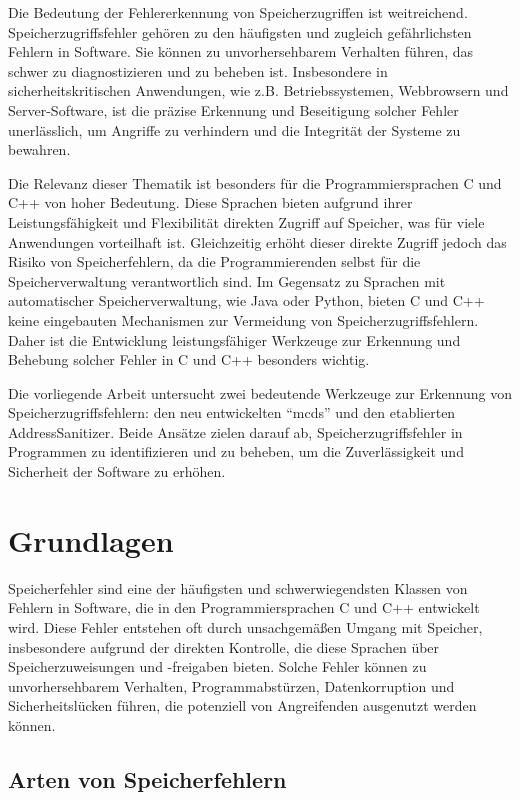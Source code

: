 \documentclass[acmtog,nonacm]{acmart}
\begin{document}
Die Bedeutung der Fehlererkennung von Speicherzugriffen ist weitreichend.
Speicherzugriffsfehler gehören zu den häufigsten und zugleich gefährlichsten
Fehlern in Software. Sie können zu unvorhersehbarem Verhalten führen, das
schwer zu diagnostizieren und zu beheben ist. Insbesondere in
sicherheitskritischen Anwendungen, wie z.B. Betriebssystemen, Webbrowsern und
Server-Software, ist die präzise Erkennung und Beseitigung solcher Fehler
unerlässlich, um Angriffe zu verhindern und die Integrität der Systeme zu
bewahren.

Die Relevanz dieser Thematik ist besonders für die Programmiersprachen C und
C++ von hoher Bedeutung. Diese Sprachen bieten aufgrund ihrer
Leistungsfähigkeit und Flexibilität direkten Zugriff auf Speicher, was für
viele Anwendungen vorteilhaft ist. Gleichzeitig erhöht dieser direkte Zugriff
jedoch das Risiko von Speicherfehlern, da die Programmierenden selbst für die
Speicherverwaltung verantwortlich sind. Im Gegensatz zu Sprachen mit
automatischer Speicherverwaltung, wie Java oder Python, bieten C und C++ keine
eingebauten Mechanismen zur Vermeidung von Speicherzugriffsfehlern. Daher ist
die Entwicklung leistungsfähiger Werkzeuge zur Erkennung und Behebung solcher
Fehler in C und C++ besonders wichtig.

Die vorliegende Arbeit untersucht zwei bedeutende Werkzeuge zur Erkennung von
Speicherzugriffsfehlern: den neu entwickelten "`mcds"' und den etablierten
AddressSanitizer. Beide Ansätze zielen darauf ab, Speicherzugriffsfehler
in Programmen zu identifizieren und zu beheben, um die Zuverlässigkeit und
Sicherheit der Software zu erhöhen.

\section{Grundlagen}\label{sec:grundlagen}

Speicherfehler sind eine der häufigsten und schwerwiegendsten Klassen von
Fehlern in Software, die in den Programmiersprachen C und C++ entwickelt wird.
Diese Fehler entstehen oft durch unsachgemäßen Umgang mit Speicher,
insbesondere aufgrund der direkten Kontrolle, die diese Sprachen über
Speicherzuweisungen und -freigaben bieten. Solche Fehler können zu
unvorhersehbarem Verhalten, Programmabstürzen, Datenkorruption und
Sicherheitslücken führen, die potenziell von Angreifenden ausgenutzt werden
können.

\subsection{Arten von Speicherfehlern}
\end{document}
